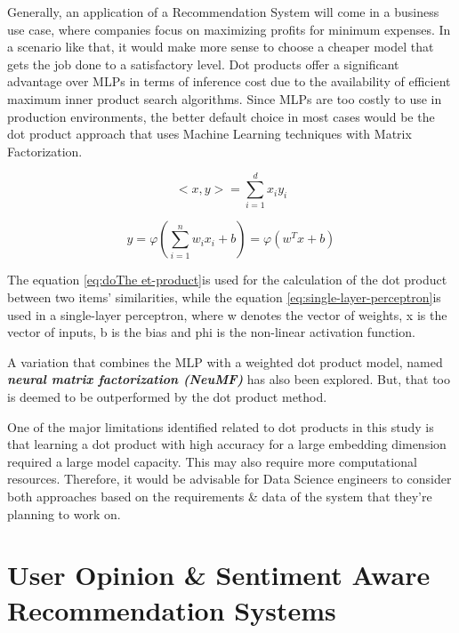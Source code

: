 \documentclass[manuscript,screen,review]{acmart}
\begin{document}
Generally, an application of a Recommendation System will come in a business use case, where companies focus on maximizing profits for minimum expenses. In a scenario like that, it would make more sense to choose a cheaper model that gets the job done to a satisfactory level. Dot products offer a significant advantage over MLPs in terms of inference cost due to the availability of efficient maximum inner product search algorithms. Since MLPs are too costly to use in production environments, the better default choice in most cases would be the dot product approach that uses Machine Learning techniques with Matrix Factorization.

\begin{equation}
<x,y>  = \sum_{i=1}^{d}x_{i}y_{i}\label{eq:dot-product}
\end{equation}

\begin{equation}
y = \varphi(\sum_{i=1}^{n}w_{i}x_{i}+b) = \varphi(w^{T}x+b)\label{eq:single-layer-perceptron}
\end{equation}

The equation \ref{eq:doThe et-product}is used for the calculation of the dot product between two items' similarities, while the equation \ref{eq:single-layer-perceptron}is used in a single-layer perceptron, where w denotes the vector of weights, x is the vector of inputs, b is the bias and phi is the non-linear activation function.

A variation that combines the MLP with a weighted dot product model, named \textbf{\emph{neural matrix factorization (NeuMF)}} has also been explored. But, that too is deemed to be outperformed by the dot product method.

One of the major limitations identified related to dot products in this study is that learning a dot product with high accuracy for a large embedding dimension required a large model capacity. This may also require more computational resources. Therefore, it would be advisable for Data Science engineers to consider both approaches based on the requirements \& data of the system that they're planning to work on.



\section{User Opinion \& Sentiment Aware Recommendation Systems}
\end{document}
